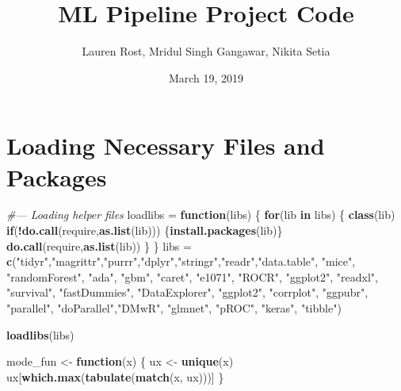 \documentclass[]{article}
\title{ML Pipeline Project Code}
\author{Lauren Rost, Mridul Singh Gangawar, Nikita Setia}
\date{March 19, 2019}
\newenvironment{Shaded}{\begin{snugshade}}{\end{snugshade}}
\newcommand{\KeywordTok}[1]{\textcolor[rgb]{0.13,0.29,0.53}{\textbf{#1}}}
\newcommand{\StringTok}[1]{\textcolor[rgb]{0.31,0.60,0.02}{#1}}
\newcommand{\CommentTok}[1]{\textcolor[rgb]{0.56,0.35,0.01}{\textit{#1}}}
\newcommand{\ControlFlowTok}[1]{\textcolor[rgb]{0.13,0.29,0.53}{\textbf{#1}}}
\newcommand{\OperatorTok}[1]{\textcolor[rgb]{0.81,0.36,0.00}{\textbf{#1}}}
\newcommand{\NormalTok}[1]{#1}
\begin{document}
\maketitle

\section{Loading Necessary Files and
Packages}\label{loading-necessary-files-and-packages}

\begin{Shaded}
\begin{Highlighting}[]
\CommentTok{#--- Loading helper files }
\NormalTok{loadlibs =}\StringTok{ }\ControlFlowTok{function}\NormalTok{(libs) \{}
  \ControlFlowTok{for}\NormalTok{(lib }\ControlFlowTok{in}\NormalTok{ libs) \{}
    \KeywordTok{class}\NormalTok{(lib)}
    \ControlFlowTok{if}\NormalTok{(}\OperatorTok{!}\KeywordTok{do.call}\NormalTok{(require,}\KeywordTok{as.list}\NormalTok{(lib))) \{}\KeywordTok{install.packages}\NormalTok{(lib)\}}
    \KeywordTok{do.call}\NormalTok{(require,}\KeywordTok{as.list}\NormalTok{(lib))}
\NormalTok{  \}}
\NormalTok{\}}
\NormalTok{libs =}\StringTok{ }\KeywordTok{c}\NormalTok{(}\StringTok{"tidyr"}\NormalTok{,}\StringTok{"magrittr"}\NormalTok{,}\StringTok{"purrr"}\NormalTok{,}\StringTok{"dplyr"}\NormalTok{,}\StringTok{"stringr"}\NormalTok{,}\StringTok{"readr"}\NormalTok{,}\StringTok{"data.table"}\NormalTok{, }\StringTok{"mice"}\NormalTok{, }
         \StringTok{"randomForest"}\NormalTok{, }\StringTok{"ada"}\NormalTok{, }\StringTok{"gbm"}\NormalTok{, }\StringTok{"caret"}\NormalTok{, }\StringTok{"e1071"}\NormalTok{, }\StringTok{"ROCR"}\NormalTok{, }\StringTok{"ggplot2"}\NormalTok{, }\StringTok{"readxl"}\NormalTok{,}
         \StringTok{"survival"}\NormalTok{, }\StringTok{"fastDummies"}\NormalTok{, }\StringTok{"DataExplorer"}\NormalTok{, }\StringTok{"ggplot2"}\NormalTok{, }\StringTok{"corrplot"}\NormalTok{, }\StringTok{"ggpubr"}\NormalTok{, }
         \StringTok{"parallel"}\NormalTok{, }\StringTok{"doParallel"}\NormalTok{,}\StringTok{"DMwR"}\NormalTok{, }\StringTok{"glmnet"}\NormalTok{, }\StringTok{"pROC"}\NormalTok{, }\StringTok{"keras"}\NormalTok{, }\StringTok{"tibble"}\NormalTok{)}

\KeywordTok{loadlibs}\NormalTok{(libs)}

\NormalTok{mode_fun <-}\StringTok{ }\ControlFlowTok{function}\NormalTok{(x) \{}
\NormalTok{  ux <-}\StringTok{ }\KeywordTok{unique}\NormalTok{(x)}
\NormalTok{  ux[}\KeywordTok{which.max}\NormalTok{(}\KeywordTok{tabulate}\NormalTok{(}\KeywordTok{match}\NormalTok{(x, ux)))]}
\NormalTok{\}}


\end{Highlighting}
\end{Shaded}
\end{document}
